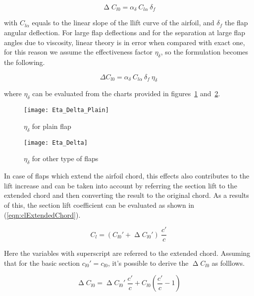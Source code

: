 \begin{equation}
\upDelta C_{l0}=\alpha_\delta\ C_{l\alpha}\ \delta_f
\label{eqn:DeltaCl0}
\end{equation}

with $C_{l\alpha}$ equals to the linear slope of the llift curve of the airfoil, and $\delta_{f}$ the flap angular deflection. For large flap deflections and for the separation at large flap angles due to viscosity, linear theory is in error when compared with exact one, for this reason we assume the effectiveness factor $\eta_\delta$, so the formulation becomes the following.

\begin{equation}
\Delta C_{l0}=\alpha_\delta\ C_{l\alpha}\ \delta_f\ \eta_\delta
\label{eqn:DeltaCl0EtaDelta}
\end{equation}

where $\eta_\delta$ can be evaluated from the charts provided in figures~\ref{fig:EtaDeltaPlain} and~\ref{fig:EtaDelta}.

\begin{figure}[!t]
  \centering
  \texttt{[image: Eta\_Delta\_Plain]}
  \caption{$\eta_\delta$ for plain flap}
  \label{fig:EtaDeltaPlain}
\end{figure}

\begin{figure}[!b]
  \centering
  \texttt{[image: Eta\_Delta]}
  \caption{$\eta_\delta$ for other type of flaps}
  \label{fig:EtaDelta}
\end{figure}

\noindent
In case of flaps which extend the airfoil chord, this effects also contributes to the lift increase and can be taken into account by referring the section lift to the extended chord and then converting the result to the original chord. As a results of this, the section lift coefficient can be evaluated as shown in (\ref{eqn:clExtendedChord}).

\begin{equation}
C_{l}=\left(C_{l0}'+\upDelta C_{l0}'\right)\ \frac{c'}{c}
\label{eqn:clExtendedChord}
\end{equation}

\noindent 
Here the variables with superscript are referred to the extended chord. Assuming that for the basic section $c_{l0}'=c_{l0}$, it's possible to derive the $\upDelta C_{l0}$ as folllows.

\begin{equation}
\upDelta C_{l0}=\upDelta C_{l0}'\ \frac{c'}{c}+C_{l0}\left(\frac{c'}{c}-1\right)
\label{eqn:Deltacl0Final}
\end{equation}

